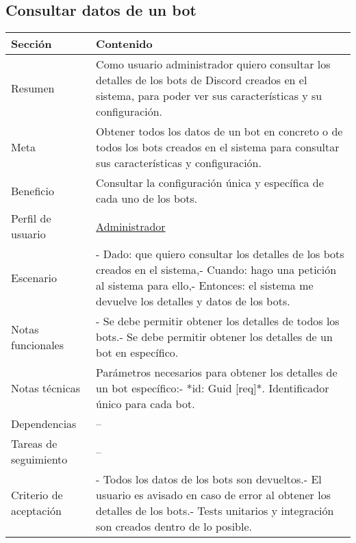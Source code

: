 \subsection{Consultar datos de un bot}

\begin{table}[H]
    \centering
    \begin{adjustbox}{max width=\textwidth}
    \begin{tabularx}{\textwidth}{|l|L|}
    \hline
        Sección & Contenido \\ \hline
        Resumen & Como usuario administrador quiero consultar los detalles de los bots de Discord creados en el sistema, para poder ver sus características y su configuración. \\ \hline
        Meta & Obtener todos los datos de un bot en concreto o de todos los bots creados en el sistema para consultar sus características y configuración. \\ \hline
        Beneficio & Consultar la configuración única y específica de cada uno de los bots. \\ \hline
        Perfil de usuario & \hyperref[sec:personaAdmin]{Administrador} \\ \hline
        Escenario & - Dado: que quiero consultar los detalles de los bots creados en el sistema,\linebreak - Cuando: hago una petición al sistema para ello,\linebreak - Entonces: el sistema me devuelve los detalles y datos de los bots. \\ \hline
        Notas funcionales & - Se debe permitir obtener los detalles de todos los bots.\linebreak - Se debe permitir obtener los detalles de un bot en específico. \\ \hline
        Notas técnicas & Parámetros necesarios para obtener los detalles de un bot específico:\linebreak - *id: Guid [req]*. Identificador único para cada bot. \\ \hline
        Dependencias & – \\ \hline
        Tareas de seguimiento & – \\ \hline
        Criterio de aceptación & - Todos los datos de los bots son devueltos.\linebreak - El usuario es avisado en caso de error al obtener los detalles de los bots.\linebreak - Tests unitarios y integración son creados dentro de lo posible. \\ \hline
    \end{tabularx}
    \end{adjustbox}
\end{table}

